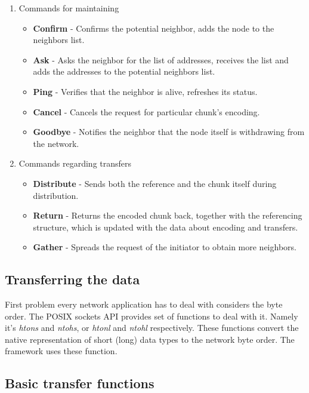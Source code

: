 \begin{enumerate}
\item {\large Commands for maintaining}
\begin{itemize}
\item  \textbf{Confirm} - Confirms the potential neighbor, adds the node to the neighbors list.
\item  \textbf{Ask} - Asks the neighbor for the list of addresses, receives the list and adds the addresses to the potential neighbors list.
\item  \textbf{Ping} - Verifies that the neighbor is alive, refreshes its status.
\item  \textbf{Cancel} - Cancels the request for particular chunk's encoding.
\item  \textbf{Goodbye} - Notifies the neighbor that the node itself is withdrawing from the network.
\end{itemize}
\item {\large Commands regarding transfers}
\begin{itemize}
\item  \textbf{Distribute} - Sends both the reference and the chunk itself during distribution.
\item  \textbf{Return} - Returns the encoded chunk back, together with the referencing structure, which is updated with the data about encoding and transfers.
\item  \textbf{Gather} - Spreads the request of the initiator to obtain more neighbors.
\end{itemize}
\end{enumerate}

\subsection{Transferring the data}\label{transferring-the-data}

First problem every network application has to deal with considers the
byte order. The POSIX sockets API provides set of functions to deal with
it. Namely it's \textit{htons} and \textit{ntohs}, or \textit{htonl} and
\textit{ntohl} respectively. These functions convert the native
representation of short (long) data types to the network byte order. The
framework uses these function.

\subsection*{Basic transfer functions}

